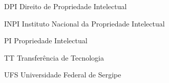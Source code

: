 
\begin{siglas}
\item[DPI]{Direito de Propriedade Intelectual}
\item[INPI]{Instituto Nacional da Propriedade Intelectual}
\item[PI]{Propriedade Intelectual}
\item[TT]{Transferência de Tecnologia}
\item[UFS]{Universidade Federal de Sergipe}
\end{siglas}
